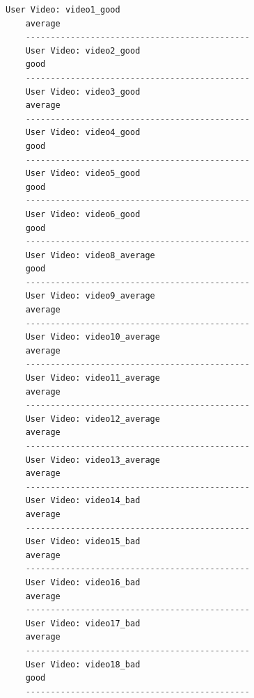 \begin{lstlisting}[language=python, showstringspaces=false,frame=single]
    User Video: video1_good
    average
    ---------------------------------------------
    User Video: video2_good
    good
    ---------------------------------------------
    User Video: video3_good
    average
    ---------------------------------------------
    User Video: video4_good
    good
    ---------------------------------------------
    User Video: video5_good
    good
    ---------------------------------------------
    User Video: video6_good
    good
    ---------------------------------------------
    User Video: video8_average
    good
    ---------------------------------------------
    User Video: video9_average
    average
    ---------------------------------------------
    User Video: video10_average
    average
    ---------------------------------------------
    User Video: video11_average
    average
    ---------------------------------------------
    User Video: video12_average
    average
    ---------------------------------------------
    User Video: video13_average
    average
    ---------------------------------------------
    User Video: video14_bad
    average
    ---------------------------------------------
    User Video: video15_bad
    average
    ---------------------------------------------
    User Video: video16_bad
    average
    ---------------------------------------------
    User Video: video17_bad
    average
    ---------------------------------------------
    User Video: video18_bad
    good
    ---------------------------------------------
    
  
  \end{lstlisting}
